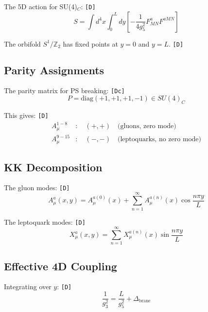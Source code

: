 \documentclass[11pt,a4paper]{article}
\newcommand{\tagD}{\textcolor{green!50!black}{\texttt{[D]}}}
\newcommand{\tagDc}{\textcolor{blue!70!black}{\texttt{[Dc]}}}
\theoremstyle{definition}
\begin{document}
The 5D action for SU(4)$_C$: \tagD{}
\begin{equation}
\label{eq:app-5d-action}
S = \int d^4x \int_0^L dy \left[-\frac{1}{4g_5^2} F_{MN}^a F^{aMN}\right]
\end{equation}

The orbifold $S^1/\mathbb{Z}_2$ has fixed points at $y = 0$ and $y = L$. \tagD{}

\subsection{Parity Assignments}
\label{app:parity}

The parity matrix for PS breaking: \tagDc{}
\begin{equation}
\label{eq:app-parity}
P = \text{diag}(+1, +1, +1, -1) \in SU(4)_C
\end{equation}

This gives: \tagD{}
\begin{align}
\label{eq:app-parity-even}
A_\mu^{1-8} &: \quad (+,+) \quad \text{(gluons, zero mode)} \\
\label{eq:app-parity-odd}
A_\mu^{9-15} &: \quad (-,-) \quad \text{(leptoquarks, no zero mode)}
\end{align}

\subsection{KK Decomposition}
\label{app:kk}

The gluon modes: \tagD{}
\begin{equation}
\label{eq:app-kk-gluon}
A_\mu^a(x,y) = A_\mu^{a(0)}(x) + \sum_{n=1}^\infty A_\mu^{a(n)}(x) \cos\frac{n\pi y}{L}
\end{equation}

The leptoquark modes: \tagD{}
\begin{equation}
\label{eq:app-kk-lq}
X_\mu^a(x,y) = \sum_{n=1}^\infty X_\mu^{a(n)}(x) \sin\frac{n\pi y}{L}
\end{equation}

\subsection{Effective 4D Coupling}
\label{app:4d-coupling}

Integrating over $y$: \tagD{}
\begin{equation}
\label{eq:app-4d-eff}
\frac{1}{g_3^2} = \frac{L}{g_5^2} + \Delta_{\text{brane}}
\end{equation}
\end{document}
